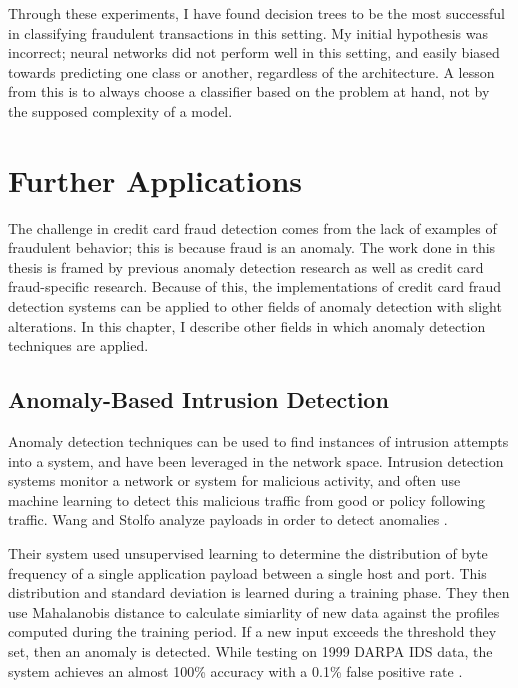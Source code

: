 \documentclass[midd]{thesis}
\begin{document}
Through these experiments, I have found decision trees to be the most successful in classifying fraudulent transactions in this setting. My initial hypothesis was incorrect; neural networks did not perform well in this setting, and easily biased towards predicting one class or another, regardless of the architecture. A lesson from this is to always choose a classifier based on the problem at hand, not by the supposed complexity of a model. 




\pagebreak
\chapter{Further Applications}
\label{sec:future}

The challenge in credit card fraud detection comes from the lack of examples of fraudulent behavior; this is because fraud is an anomaly. The work done in this thesis is framed by previous anomaly detection research as well as credit card fraud-specific research. Because of this, the implementations of credit card fraud detection systems can be applied to other fields of anomaly detection with slight alterations. In this chapter, I describe other fields in which anomaly detection techniques are applied.

\section{Anomaly-Based Intrusion Detection}

Anomaly detection techniques can be used to find instances of intrusion attempts into a system, and have been leveraged in the network space. Intrusion detection systems monitor a network or system for malicious activity, and often use machine learning to detect this malicious traffic from good or policy following traffic. Wang and Stolfo analyze payloads in order to detect anomalies \cite{Wang2004}. 

Their system used unsupervised learning to determine the distribution of byte frequency of a single application payload between a single host and port. This distribution and standard deviation is learned during a training phase. They then use Mahalanobis distance to calculate simiarlity of new data against the profiles computed during the training period. If a new input exceeds the threshold they set, then an anomaly is detected. While testing on 1999 DARPA IDS data, the system achieves an almost 100\% accuracy with a 0.1\% false positive rate \cite{Wang2004}. 
\end{document}
